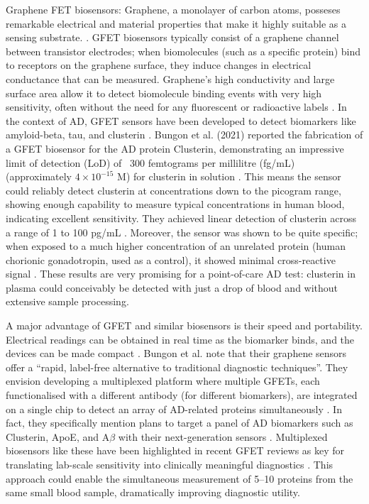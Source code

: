 \documentclass[a4paper,12pt]{article}
\begin{document}
Graphene FET biosensors: Graphene, a monolayer of carbon atoms, posseses remarkable electrical and material properties that make it highly suitable as a sensing substrate. \cite{novoselov2004electric}. GFET biosensors typically consist of a graphene channel between transistor electrodes; when biomolecules (such as a specific protein) bind to receptors on the graphene surface, they induce changes in electrical conductance that can be measured. Graphene’s high conductivity and large surface area allow it to detect biomolecule binding events with very high sensitivity, often without the need for any fluorescent or radioactive labels \cite{ohno2010label}. In the context of AD, GFET sensors have been developed to detect biomarkers like amyloid-beta, tau, and clusterin \cite{krishnan2023graphene}. Bungon et al. (2021) reported the fabrication of a GFET biosensor for the AD protein Clusterin, demonstrating an impressive limit of detection (LoD) of ~300 femtograms per millilitre (fg/mL) (approximately $4 \times 10^{-15}$ M) for clusterin in solution \cite{bungon2021graphene}. This means the sensor could reliably detect clusterin at concentrations down to the picogram range, showing enough capability to measure typical concentrations in human blood, indicating excellent sensitivity. They achieved linear detection of clusterin across a range of 1 to 100 pg/mL \cite{bungon2021graphene}. Moreover, the sensor was shown to be quite specific; when exposed to a much higher concentration of an unrelated protein (human chorionic gonadotropin, used as a control), it showed minimal cross-reactive signal \cite{bungon2021graphene}. These results are very promising for a point-of-care AD test: clusterin in plasma could conceivably be detected with just a drop of blood and without extensive sample processing.

A major advantage of GFET and similar biosensors is their speed and portability. Electrical readings can be obtained in real time as the biomarker binds, and the devices can be made compact \cite{krishnan2023graphene}. Bungon et al. note that their graphene sensors offer a “rapid, label-free alternative to traditional diagnostic techniques”. They envision developing a multiplexed platform where multiple GFETs, each functionalised with a different antibody (for different biomarkers), are integrated on a single chip to detect an array of AD-related proteins simultaneously \cite{bungon2021graphene}. In fact, they specifically mention plans to target a panel of AD biomarkers such as Clusterin, ApoE, and A$\beta$ with their next-generation sensors \cite{bungon2021graphene}. Multiplexed biosensors like these have been highlighted in recent GFET reviews as key for translating lab-scale sensitivity into clinically meaningful diagnostics \cite{ono2024challenges}. This approach could enable the simultaneous measurement of 5–10 proteins from the same small blood sample, dramatically improving diagnostic utility.
\end{document}
